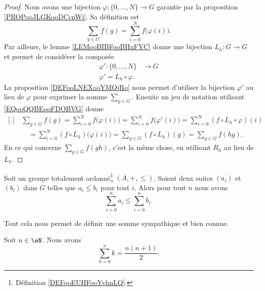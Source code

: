 \begin{proof}
	Nous avons une bijection \( \varphi\colon \{ 0,\ldots,  N \}\to G\) garantie par la proposition \ref{PROPooJLGKooDCcnWi}. Sa définition est
	\begin{equation}
		\sum_{g\in G}f(g)=\sum_{i=0}^Nf\big( \varphi(i) \big).
	\end{equation}
	Par ailleurs, le lemme \ref{LEMooBIBFooBHxFYC} donne une bijection \( L_h\colon G\to G\) et permet de considérer la composée
	\begin{equation}
		\begin{aligned}
			\varphi'\colon \{ 0,\ldots,  N \} & \to G \\
			\varphi'=L_h\circ \varphi.
		\end{aligned}
	\end{equation}
	La proposition \ref{DEFooLNEXooYMQjRo} nous permet d'utiliser la bijection \( \varphi'\) au lieu de \( \varphi\) pour exprimer la somme \( \sum_{g\in G}\). Ensuite un jeu de notation utilisant \eqref{EQooQQBEooFDOBVG} donne
	\begin{equation}
		\begin{aligned}[]
			 & \sum_{g\in G}f(g)=\sum_{i=0}^Nf\big( \varphi(i) \big)=\sum_{i=0}^Nf\big( \varphi'(i) \big)=\sum_{i=0}^N(f\circ L_h\circ \varphi)(i) \\
			 & \quad=\sum_{i=0}^N(f\circ L_h)\big( \varphi(i) \big)=\sum_{g\in G}(f\circ L_h)(g)=\sum_{g\in G}f(hg).
		\end{aligned}
	\end{equation}
	En ce qui concerne \( \sum_{g\in G}f(gh)\), c'est la même chose, en utilisant \( R_h\) au lieu de \( L_h\).
\end{proof}

\begin{lemma}       \label{LEMooKSVWooIFsfwm}
    Soit un groupe totalement ordonné\footnote{Définition \ref{DEFooEUHFooYvhnLQ}.} \( (A,+,\leq)\). Soient deux suites \( (a_i)\) et \( (b_i)\) dans \( G\) telles que \( a_i\leq b_i\) pour tout \( i\). Alors pour tout \( n\) nous avons
    \begin{equation}
        \sum_{i=0}^na_i\leq \sum_{i=0}^nb_i.
    \end{equation}
\end{lemma}

Tout cela nous permet de définir une somme sympathique et bien connue.
\begin{lemma}
	Soit \( n\in \eN\). Nous avons
	\begin{equation}
		\sum_{k=0}^nk=\frac{ n(n+1) }{ 2 }.
	\end{equation}
\end{lemma}


